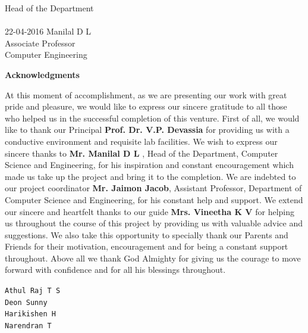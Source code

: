 \documentclass[11pt]{report}
\begin{document}
\begin{titlepage}
\begin{tabbing}
			\>Head of the Department \\

\\ 22-04-2016
\> Manilal D L\\
\> Associate Professor\\
\> Computer  Engineering\\
\end{tabbing}
\end{titlepage}
  
 

\begin{titlepage}
\vspace{.25in}	
\begin{center}
\Large\textbf{{Acknowledgments}}\\
\end{center}
\normalsize
\vspace{.25in}

\vspace{.25in}
At this moment of accomplishment, as we are presenting our work with great pride and pleasure,
we would like to express our sincere gratitude to all those who helped us in the successful completion
of this venture. First of all, we would like to thank our Principal \textbf{Prof. Dr. V.P. Devassia} for
providing us with a conductive environment and requisite lab facilities. We wish to express our
sincere thanks to \textbf{Mr. Manilal D L} , Head of the Department, Computer Science and
Engineering, for his inspiration and constant encouragement which made us take up the project
and bring it to the completion. We are indebted to our project coordinator \textbf{Mr. Jaimon Jacob},
Assistant Professor, Department of Computer Science and Engineering, for his constant help and
support. We extend our sincere and heartfelt thanks to our guide \textbf{Mrs. Vineetha K V} for helping
us throughout the course of this project by providing us with valuable advice and suggestions.
We also take this opportunity to specially thank our Parents and Friends for their motivation,
encouragement and for being a constant support throughout. Above all we thank God Almighty
for giving us the courage to move forward with confidence and for all his blessings throughout.

\begin{flushleft}
\small{\texttt{Athul Raj T S}}\\
\small{\texttt{Deon Sunny}}\\
\small{\texttt{Harikishen H}}\\
\small{\texttt{Narendran T}}
\end{flushleft}
 
\end{titlepage}
\end{document}
